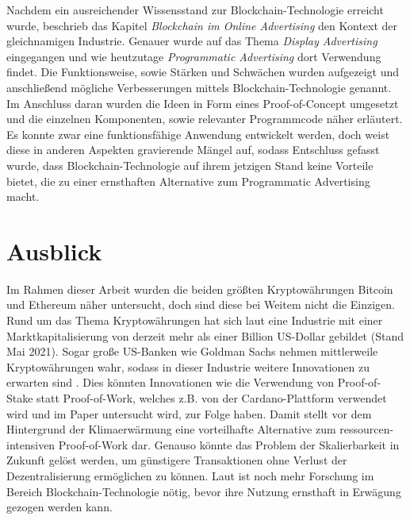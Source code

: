 Nachdem ein ausreichender Wissensstand zur Blockchain-Technologie erreicht wurde, beschrieb das Kapitel \emph{Blockchain im Online Advertising} den Kontext der gleichnamigen Industrie. Genauer wurde auf das Thema \emph{Display Advertising} eingegangen und wie heutzutage \emph{Programmatic Advertising} dort Verwendung findet. Die Funktionsweise, sowie Stärken und Schwächen wurden aufgezeigt und anschließend mögliche Verbesserungen mittels Blockchain-Technologie genannt. Im Anschluss daran wurden die Ideen in Form eines Proof-of-Concept umgesetzt und die einzelnen Komponenten, sowie relevanter Programmcode näher erläutert.\\

Es konnte zwar eine funktionsfähige Anwendung entwickelt werden, doch weist diese in anderen Aspekten gravierende Mängel auf, sodass Entschluss gefasst wurde, dass Blockchain-Technologie auf ihrem jetzigen Stand keine Vorteile bietet, die zu einer ernsthaften Alternative zum Programmatic Advertising macht.
\section{Ausblick}
Im Rahmen dieser Arbeit wurden die beiden größten Kryptowährungen Bitcoin und Ethereum näher untersucht, doch sind diese bei Weitem nicht die Einzigen. Rund um das Thema Kryptowährungen hat sich laut \cite{coinmarketcap_2021} eine Industrie mit einer Marktkapitalisierung von derzeit mehr als einer Billion US-Dollar gebildet (Stand Mai 2021). Sogar große US-Banken wie Goldman Sachs nehmen mittlerweile Kryptowährungen wahr, sodass in dieser Industrie weitere Innovationen zu erwarten sind \cite[]{handelsblatt_2021}. Dies könnten Innovationen wie die Verwendung von Proof-of-Stake statt Proof-of-Work, welches z.B. von der Cardano-Plattform verwendet wird und im Paper \cite{kiayias_2019} untersucht wird, zur Folge haben. Damit stellt vor dem Hintergrund der Klimaerwärmung eine vorteilhafte Alternative zum ressourcen-intensiven Proof-of-Work dar. Genauso könnte das Problem der Skalierbarkeit in Zukunft gelöst werden, um günstigere Transaktionen ohne Verlust der Dezentralisierung ermöglichen zu können. Laut \cite{paerssinen_2018} ist noch mehr Forschung im Bereich Blockchain-Technologie nötig, bevor ihre Nutzung ernsthaft in Erwägung gezogen werden kann.\\


